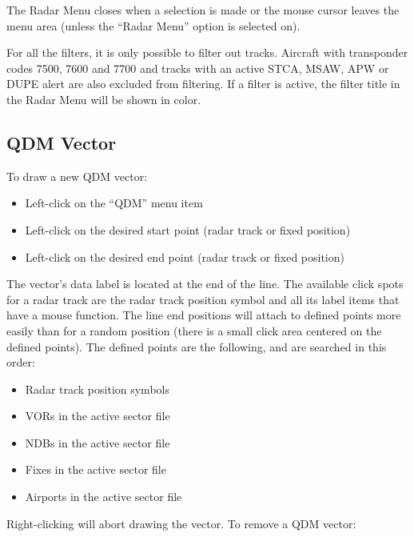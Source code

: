 \documentclass[a4paper,oneside,11pt]{memoir}
\begin{document}
\bigskip

The Radar Menu closes when a selection is made or the mouse cursor leaves the menu area (unless the “Radar Menu” option is selected on).

\bigskip

For all the filters, it is only possible to filter out  tracks. Aircraft with transponder codes 7500, 7600 and 7700 and tracks with an active STCA, MSAW, APW or DUPE alert are also excluded from filtering. If a filter is active, the filter title in the Radar Menu will be shown in  color.

\subsection{QDM Vector}
\label{tool:qdm}

To draw a new QDM vector:
\begin{itemize}
    \item Left-click on the “QDM” menu item
    \item Left-click on the desired start point (radar track or fixed position)
    \item Left-click on the desired end point (radar track or fixed position)
\end{itemize}

\bigskip

The vector’s data label is located at the end of the line. The available click spots for a radar track are the radar track position symbol and all its label items that have a mouse function.
The line end positions will attach to defined points more easily than for a random position (there is a small click area centered on the defined points). The defined points are the following, and are searched in this order:

\begin{itemize}
    \item Radar track position symbols
    \item VORs in the active sector file
    \item NDBs in the active sector file
    \item Fixes in the active sector file
    \item Airports in the active sector file
\end{itemize}

\bigskip

Right-clicking will abort drawing the vector.
To remove a QDM vector:
\end{document}
